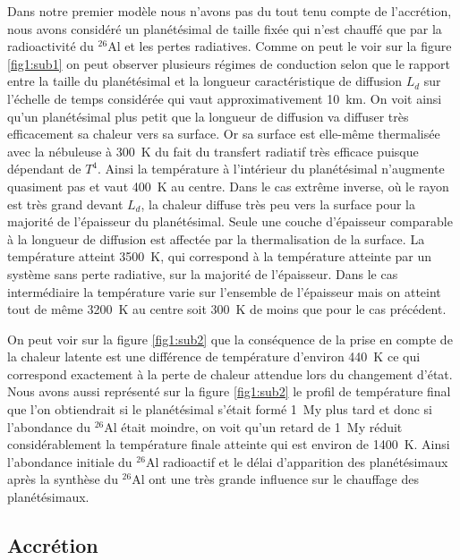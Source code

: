 \documentclass[10pt,a4paper]{article}
\numberwithin{equation}{section}
\begin{document}
Dans notre premier modèle nous n'avons pas du tout tenu compte de l'accrétion, nous avons considéré un planétésimal de taille fixée qui n'est chauffé que par la radioactivité du $^{26}$Al et les pertes radiatives. Comme on peut le voir sur la figure \ref{fig1:sub1} on peut observer plusieurs régimes de conduction selon que le rapport entre la taille du planétésimal et la longueur caractéristique de diffusion $L_d$ sur l'échelle de temps considérée qui vaut approximativement \SI{10}{km}. On voit ainsi qu'un planétésimal plus petit que la longueur de diffusion va diffuser très efficacement sa chaleur vers sa surface. Or sa surface est elle-même thermalisée avec la nébuleuse à \SI{300}{K} du fait du transfert radiatif très efficace puisque dépendant de $T^4$. Ainsi la température à l'intérieur du planétésimal n’augmente quasiment pas et vaut \SI{400}{K} au centre. Dans le cas extrême inverse, où le rayon est très grand devant $L_d$, la chaleur diffuse très peu vers la surface pour la majorité de l'épaisseur du planétésimal. Seule une couche d'épaisseur comparable à la longueur de diffusion est affectée par la thermalisation de la surface. La température atteint \SI{3500}{K}, qui correspond à la température atteinte par un système sans perte radiative, sur la majorité de l'épaisseur. Dans le cas intermédiaire la température varie sur l'ensemble de l'épaisseur mais on atteint tout de même \SI{3200}{K} au centre soit \SI{300}{K} de moins que pour le cas précédent.

On peut voir sur la figure \ref{fig1:sub2} que la conséquence  de la prise en compte de la chaleur latente est une différence de température d'environ \SI{440}{K} ce qui correspond exactement à la perte de chaleur attendue lors du changement d'état. Nous avons aussi représenté sur la figure \ref{fig1:sub2} le profil de température final que l'on obtiendrait si le planétésimal s'était formé \SI{1}{My} plus tard et donc si l'abondance du $^{26}$Al était moindre, on voit qu'un retard de \SI{1}{My} réduit considérablement la température finale atteinte qui est environ de \SI{1400}{K}. Ainsi l'abondance initiale du $^{26}$Al radioactif et le délai d'apparition des planétésimaux après la synthèse du $^{26}$Al ont une très grande influence sur le chauffage des planétésimaux.





\subsection{Accrétion}
\end{document}
